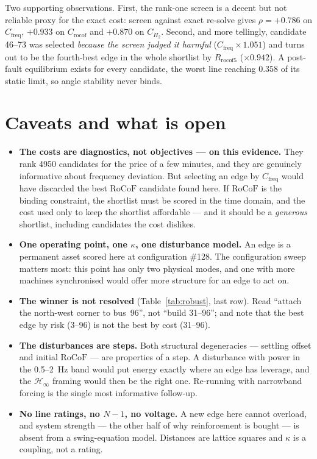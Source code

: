 \documentclass[11pt,a4paper]{article}
\newcommand{\rocof}{\ensuremath{\mathrm{RoCoF}}}
\newcommand{\Hinf}{\ensuremath{\mathcal{H}_\infty}}
\newcommand{\Cf}{\ensuremath{C_{\mathrm{freq}}}}
\newcommand{\Cr}{\ensuremath{C_{\mathrm{rocof}}}}
\newcommand{\CH}{\ensuremath{C_{H_2}}}
\newcommand{\Rr}{\ensuremath{R_{\mathrm{rocof}5}}}
\begin{document}
Two supporting observations. First, the rank-one screen is a decent but not
reliable proxy for the exact cost: screen against exact re-solve gives
$\rho=+0.786$ on \Cf{}, $+0.933$ on \Cr{} and $+0.870$ on \CH{}. Second, and more
tellingly, candidate 46--73 was selected \emph{because the screen judged it
harmful} ($\Cf\times1.051$) and turns out to be the fourth-best edge in the whole
shortlist by $\Rr$ ($\times0.942$). A post-fault equilibrium exists for every
candidate, the worst line reaching $0.358$ of its static limit, so angle
stability never binds.

\section{Caveats and what is open}

\begin{itemize}
  \item \textbf{The costs are diagnostics, not objectives --- on this evidence.}
        They rank 4950 candidates for the price of a few minutes, and they are
        genuinely informative about frequency deviation. But selecting an edge by
        \Cf{} would have discarded the best \rocof{} candidate found here. If
        \rocof{} is the binding constraint, the shortlist must be scored in the
        time domain, and the cost used only to keep the shortlist affordable ---
        and it should be a \emph{generous} shortlist, including candidates the
        cost dislikes.
  \item \textbf{One operating point, one $\kappa$, one disturbance model.} An
        edge is a permanent asset scored here at configuration \#128. The
        configuration sweep matters most: this point has only two physical modes,
        and one with more machines synchronised would offer more structure for an
        edge to act on.
  \item \textbf{The winner is not resolved} (Table~\ref{tab:robust}, last row).
        Read ``attach the north-west corner to bus~96'', not ``build 31--96'';
        and note that the best edge by risk (3--96) is not the best by cost
        (31--96).
  \item \textbf{The disturbances are steps.} Both structural degeneracies ---
        settling offset and initial \rocof{} --- are properties of a step. A
        disturbance with power in the 0.5--\SI{2}{\hertz} band would put energy
        exactly where an edge has leverage, and the \Hinf{} framing would then be
        the right one. Re-running with narrowband forcing is the single most
        informative follow-up.
  \item \textbf{No line ratings, no $N-1$, no voltage.} A new edge here cannot
        overload, and system strength --- the other half of why reinforcement is
        bought --- is absent from a swing-equation model. Distances are lattice
        squares and $\kappa$ is a coupling, not a rating.
\end{itemize}
\end{document}
